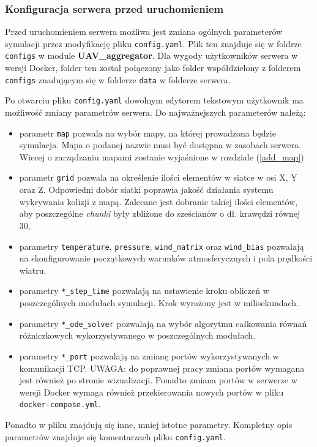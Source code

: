 \documentclass[15pt]{sprawozdanie}
\begin{document}
\subsubsection{Konfiguracja serwera przed uruchomieniem}

Przed uruchomieniem serwera możliwa jest zmiana ogólnych parameterów symulacji przez modyfikację pliku \texttt{config.yaml}. Plik ten znajduje się w foldrze \texttt{configs} w module \textbf{UAV\_aggregator}. Dla wygody użytkowników serwera w wersji Docker, folder ten został połączony jako folder współdzielony z folderem \texttt{configs} znadującym się w folderze \texttt{data} w folderze serwera.

Po otwarciu pliku \texttt{config.yaml} dowolnym edytorem tekstowym użytkownik ma możliwość zmiany parametrów serwera. Do najważnejszych parameterów należą:
 \begin{itemize}
\item parametr \texttt{map} pozwala na wybór mapy, na której prowadzona będzie symulacja. Mapa o podanej nazwie musi być dostępna w zasobach serwera. Wiecej o zarządzaniu mapami zostanie wyjaśnione w rozdziale (\ref{add_map})
\item parametr \texttt{grid} pozwala na określenie ilości elementów w siatce w osi X, Y oraz Z. Odpowiedni dobór siatki poprawia jakość działania systemu wykrywania kolizji z mapą. Zalecane jest dobranie takiej ilości elementów, aby poszczególne \textit{chunki} były zbliżone do sześcianów o dł. krawędzi równej 30,
\item parametry \texttt{temperature}, \texttt{pressure}, \texttt{wind\_matrix} oraz \texttt{wind\_bias} pozwalają na skonfigurowanie początkowych warunków atmosferycznych i pola prędkości wiatru. 
\item parametry \texttt{*\_step\_time} pozwalają na ustawienie kroku obliczeń w poszczególnych modułach symulacji. Krok wyrażony jest w milisekundach.
\item parametry \texttt{*\_ode\_solver} pozwalają na wybór algorytmu całkowania równań różniczkowych wykorzystywanego w poszczególnych modułach.
\item parametry \texttt{*\_port} pozwalają na zmianę portów wykorzystywanych w komunikacji TCP. UWAGA: do poprawnej pracy zmiana portów wymagana jest również po stronie wizualizacji. Ponadto zmiana portów w serwerze w wersji Docker wymaga również przekierowania nowych portów w pliku \texttt{docker-compose.yml}.
\end{itemize}

Ponadto w pliku znajdują się inne, mniej istotne parametry. Kompletny opis parametrów znajduje się komentarzach pliku \texttt{config.yaml}.
\end{document}
